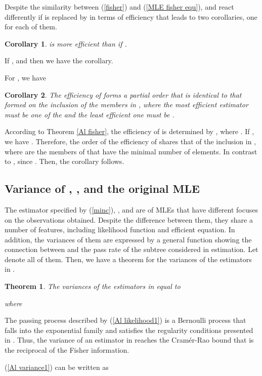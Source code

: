 \documentclass[10pt,onecolumn]{IEEEtran}
\newtheorem{theorem}{\bf Theorem}
\newtheorem{corollary}{\bf Corollary}
\begin{document}
Despite the similarity between (\ref{fisher}) and (\ref{MLE fisher equ}),   and  react differently if  is replaced by  in terms of efficiency that leads to two corollaries, one for each of them.
\begin{corollary}
 is more efficient than  if .
\end{corollary}
\begin{IEEEproof}
If ,  and then we have the corollary.
\end{IEEEproof}
For , we have
\begin{corollary} 
The efficiency of  forms a partial order that is identical to that formed on the inclusion of the members in , where the most efficient estimator must be one of the  and the least efficient one must be .
\label{Al corollary}
\end{corollary}
\begin{IEEEproof}
According to Theorem \ref{Al fisher}, the efficiency of  is determined by , where . If , we have
 .
 Therefore, the order of the efficiency of  shares that of the inclusion in , where  are the members of  that have the minimal number of elements.
 In contrast to ,  since . Then, the corollary follows.
\end{IEEEproof}

\subsection{Variance of , , and the original MLE}
The estimator specified by (\ref{minc}),  , and  are of MLEs that have different focuses on the observations obtained. Despite the difference between them, they share a number of features, including likelihood function and efficient equation. In addition, the variances of them are expressed by a general function showing the connection between  and the pass rate of the subtree considered in estimation. Let  denote all of them. Then, we have a theorem for the variances of the estimators in .

\begin{theorem} \label{Al variance}
The variances of the estimators in  equal to

where 

\end{theorem}
\begin{IEEEproof}
The passing process described by (\ref{Al likelihood1}) is a Bernoulli process that falls into the exponential family and satisfies the regularity conditions presented in \cite{Joshi76}. Thus, the variance of  an estimator in  reaches the Cram\'{e}r-Rao bound that is the reciprocal of the Fisher information.
\end{IEEEproof}
(\ref{Al variance1}) can be written as
\end{document}
